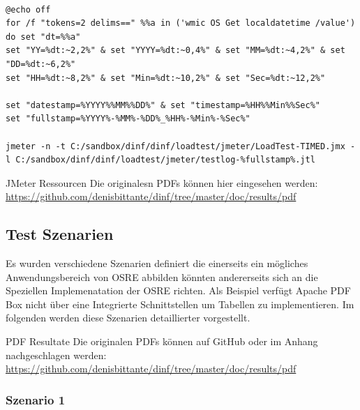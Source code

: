 \documentclass[main.tex]{subfiles}
\begin{document}
\begin{lstlisting}[language=command.com]
           
@echo off
for /f "tokens=2 delims==" %%a in ('wmic OS Get localdatetime /value') do set "dt=%%a"
set "YY=%dt:~2,2%" & set "YYYY=%dt:~0,4%" & set "MM=%dt:~4,2%" & set "DD=%dt:~6,2%"
set "HH=%dt:~8,2%" & set "Min=%dt:~10,2%" & set "Sec=%dt:~12,2%"

set "datestamp=%YYYY%%MM%%DD%" & set "timestamp=%HH%%Min%%Sec%"
set "fullstamp=%YYYY%-%MM%-%DD%_%HH%-%Min%-%Sec%"

jmeter -n -t C:/sandbox/dinf/dinf/loadtest/jmeter/LoadTest-TIMED.jmx -l C:/sandbox/dinf/dinf/loadtest/jmeter/testlog-%fullstamp%.jtl

\end{lstlisting}




\begin{reference}{JMeter Ressourcen}
 Die originalesn PDFs können hier eingesehen werden: \url{https://github.com/denisbittante/dinf/tree/master/doc/results/pdf}
 
\end{reference}



\subsection{Test Szenarien}
Es wurden verschiedene Szenarien definiert die einerseits ein mögliches Anwendungsbereich von OSRE abbilden könnten andererseits sich an die Speziellen Implemenatation der OSRE richten. Als Beispiel verfügt Apache PDF Box nicht über eine Integrierte Schnittstellen um Tabellen zu implementieren. Im folgenden werden diese Szenarien detaillierter vorgestellt.  


\begin{reference}{PDF Resultate}
 Die originalen PDFs können auf GitHub oder im Anhang nachgeschlagen werden: \url{https://github.com/denisbittante/dinf/tree/master/doc/results/pdf}
 
\end{reference}

\subsubsection{Szenario 1}
\end{document}
